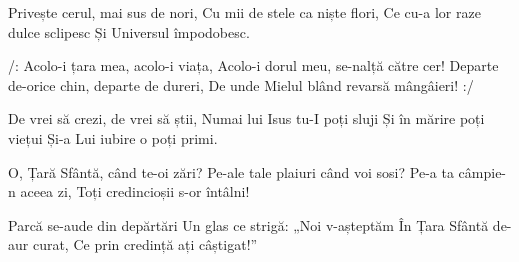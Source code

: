 \beginverse
Privește cerul, mai sus de nori,
Cu mii de stele ca niște flori,
Ce cu-a lor raze dulce sclipesc
Și Universul împodobesc.
\endverse

\beginchorus
/: Acolo-i țara mea, acolo-i viața,
Acolo-i dorul meu, se-nalță către cer!
Departe de-orice chin, departe de dureri,
De unde Mielul blând revarsă mângâieri! :/
\endchorus

\beginverse
De vrei să crezi, de vrei să știi,
Numai lui Isus tu-I poți sluji
Și în mărire poți viețui
Și-a Lui iubire o poți primi.
\endverse

\beginverse
O, Țară Sfântă, când te-oi zări?
Pe-ale tale plaiuri când voi sosi?
Pe-a ta câmpie-n aceea zi,
Toți credincioșii s-or întâlni!
\endverse

\beginverse
Parcă se-aude din depărtări
Un glas ce strigă: „Noi v-așteptăm
În Țara Sfântă de-aur curat,
Ce prin credință ați câștigat!”
\endverse
\endsong